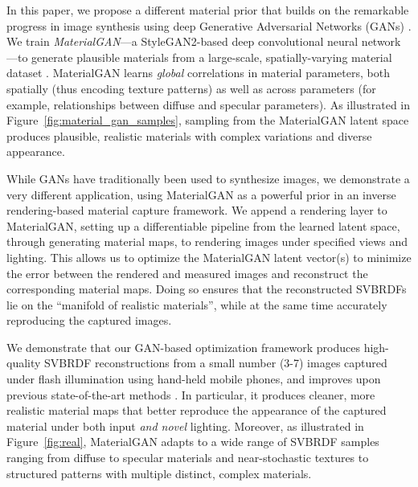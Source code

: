 In this paper, we propose a different material prior that builds on the remarkable progress in image synthesis using deep Generative Adversarial Networks (GANs) \cite{Goodfellow2014,Karras2018,StyleGAN}.
We train \emph{MaterialGAN}---a StyleGAN2-based deep convolutional neural network \cite{StyleGAN2}---to generate plausible materials from a large-scale, spatially-varying material dataset \cite{Deschaintre2018}.
MaterialGAN learns \emph{global} correlations in material parameters, both spatially (thus encoding texture patterns) as well as across parameters (for example, relationships between diffuse and specular parameters).
As illustrated in Figure~\ref{fig:material_gan_samples}, sampling from the MaterialGAN latent space produces plausible, realistic materials with complex variations and diverse appearance.

While GANs have traditionally been used to synthesize images, we demonstrate a very different application, using MaterialGAN as a powerful prior in an inverse rendering-based material capture framework.
We append a rendering layer to MaterialGAN, setting up a differentiable pipeline from the learned latent space, through generating material maps, to rendering images under specified views and lighting.
This allows us to optimize the MaterialGAN latent vector(s) to minimize the error between the rendered and measured images and reconstruct the corresponding material maps.
Doing so ensures that the reconstructed SVBRDFs lie on the ``manifold of realistic materials'', while at the same time accurately reproducing the captured images.


We demonstrate that our GAN-based optimization framework produces high-quality SVBRDF reconstructions from a small number (3-7) images captured under flash illumination using hand-held mobile phones, and improves upon previous state-of-the-art methods \cite{Gao2019,Deschaintre2019}.
In particular, it produces cleaner, more realistic material maps that better reproduce the appearance of the captured material under both input \emph{and novel} lighting.
Moreover, as illustrated in Figure~\ref{fig:real}, MaterialGAN adapts to a wide range of SVBRDF samples ranging from diffuse to specular materials and near-stochastic textures to structured patterns with multiple distinct, complex materials.

